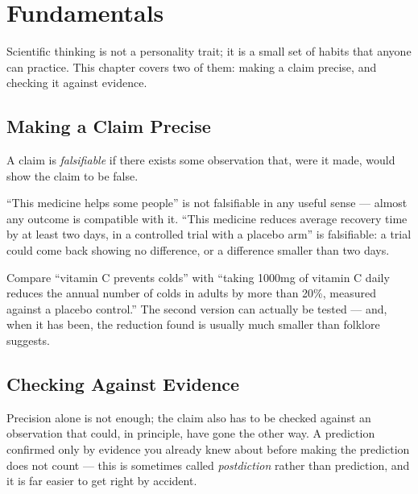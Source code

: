 \chapter{Fundamentals}
\label{ch:fundamentals}

Scientific thinking is not a personality trait; it is a small set of
habits that anyone can practice. This chapter covers two of them:
making a claim precise, and checking it against evidence.

\section{Making a Claim Precise}
\label{sec:precise-claims}

\begin{definition}
A claim is \emph{falsifiable} if there exists some observation that,
were it made, would show the claim to be false.
\end{definition}

``This medicine helps some people'' is not falsifiable in any useful
sense — almost any outcome is compatible with it. ``This medicine
reduces average recovery time by at least two days, in a controlled
trial with a placebo arm'' is falsifiable: a trial could come back
showing no difference, or a difference smaller than two days.

\begin{example}
Compare ``vitamin C prevents colds'' with ``taking 1000mg of vitamin C
daily reduces the annual number of colds in adults by more than 20\%,
measured against a placebo control.'' The second version can actually
be tested — and, when it has been, the reduction found is usually much
smaller than folklore suggests.
\end{example}

\section{Checking Against Evidence}
\label{sec:evidence}

Precision alone is not enough; the claim also has to be checked
against an observation that could, in principle, have gone the other
way. A prediction confirmed only by evidence you already knew about
before making the prediction does not count — this is sometimes called
\emph{postdiction} rather than prediction, and it is far easier to get
right by accident.
